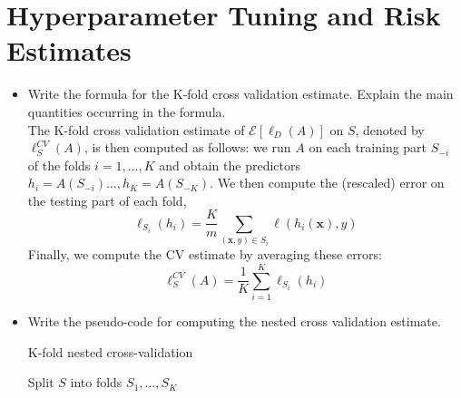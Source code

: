 \newpage
\section{Hyperparameter Tuning and Risk Estimates}

\begin{itemize}
    \item Write the formula for the K-fold cross validation estimate. Explain the main quantities occurring in the formula.\\

        The K-fold cross validation estimate of $\mathcal{E}[\ell_{D}(A)]$ on $S$, denoted by $\ell_{S}^{CV}(A)$, is then computed as follows: we run $A$ on each training part $S_{-i}$ of the folds $i = 1, \dots, K$ and obtain the predictors $h_i = A(S_{-i}) \dots, h_K = A(S_{-K})$. We then compute the (rescaled) error on the testing part of each fold,
        $$
        \ell_{S_{i}}(h_i) = \frac{K}{m} \sum_{(\boldsymbol{x},y) \in S_{i}} \ell(h_i(\boldsymbol{x}), y)
        $$
        Finally, we compute the CV estimate by averaging these errors:
        $$
        \ell_{S}^{CV}(A) = \frac{1}{K} \sum_{i=1}^{K} \ell_{S_{i}}(h_i)
        $$


    \item Write the pseudo-code for computing the nested cross validation estimate.\\

        \begin{algorithm}[H]
            \SetAlgoLined
            \DontPrintSemicolon
            \caption{K-fold nested cross-validation}
            Split $S$ into folds $S_1, \dots, S_K$\\
        \end{algorithm}

\end{itemize}
